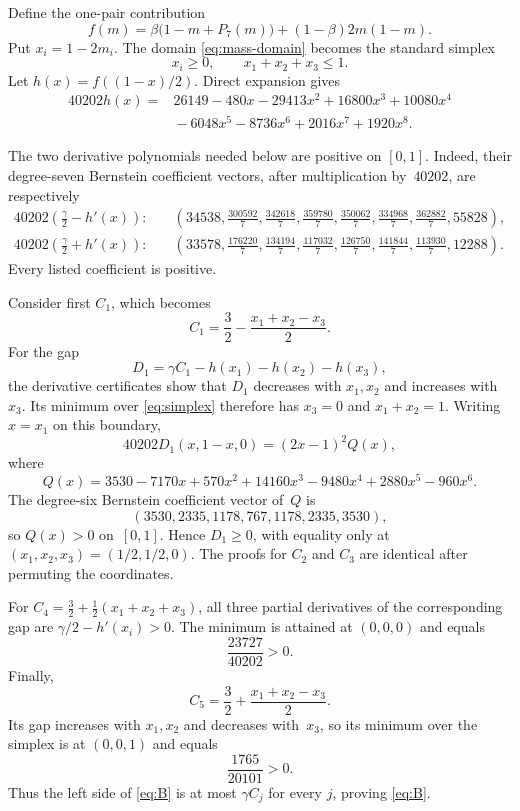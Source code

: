 \documentclass[11pt,letterpaper]{article}
\theoremstyle{definition}
\theoremstyle{remark}
\newcommand{\1}{\mathbf{1}}
\begin{document}
Define the one-pair contribution
\[
 f(m)=\beta\bigl(1-m+P_7(m)\bigr)
 +(1-\beta)2m(1-m).
\]
Put $x_i=1-2m_i$.  The domain \eqref{eq:mass-domain} becomes the standard simplex
\begin{equation}\label{eq:simplex}
 x_i\ge0,
 \qquad
 x_1+x_2+x_3\le1.
\end{equation}
Let $h(x)=f((1-x)/2)$.  Direct expansion gives
\begin{align}
 40202h(x)={}&26149-480x-29413x^2+16800x^3+10080x^4\nonumber\\
 &{}-6048x^5-8736x^6+2016x^7+1920x^8.
 \label{eq:hpoly}
\end{align}
\begin{samepage}
The two derivative polynomials needed below are positive on $[0,1]$.  Indeed, their degree-seven Bernstein coefficient vectors, after multiplication by~$40202$, are respectively
\begin{align*}
 40202\left(\frac\gamma2-h'(x)\right):\quad
 &\left(34538,\frac{300592}{7},\frac{342618}{7},
 \frac{359780}{7},\frac{350062}{7},\frac{334968}{7},
 \frac{362882}{7},55828\right),\\
 40202\left(\frac\gamma2+h'(x)\right):\quad
 &\left(33578,\frac{176220}{7},\frac{134194}{7},
 \frac{117032}{7},\frac{126750}{7},\frac{141844}{7},
 \frac{113930}{7},12288\right).
\end{align*}
Every listed coefficient is positive.
\end{samepage}

Consider first $C_1$, which becomes
\[
 C_1=\frac32-\frac{x_1+x_2-x_3}{2}.
\]
For the gap
\[
 D_1=\gamma C_1-h(x_1)-h(x_2)-h(x_3),
\]
the derivative certificates show that $D_1$ decreases with $x_1,x_2$ and increases with~$x_3$.  Its minimum over \cref{eq:simplex} therefore has $x_3=0$ and $x_1+x_2=1$.  Writing $x=x_1$ on this boundary,
\begin{equation}\label{eq:boundary-factor}
 40202D_1(x,1-x,0)=(2x-1)^2Q(x),
\end{equation}
where
\[
 Q(x)=3530-7170x+570x^2+14160x^3-9480x^4+2880x^5-960x^6.
\]
The degree-six Bernstein coefficient vector of~$Q$ is
\[
 (3530,2335,1178,767,1178,2335,3530),
\]
so $Q(x)>0$ on~$[0,1]$.  Hence $D_1\ge0$, with equality only at $(x_1,x_2,x_3)=(1/2,1/2,0)$.  The proofs for $C_2$ and $C_3$ are identical after permuting the coordinates.

For $C_4=\frac32+\frac12(x_1+x_2+x_3)$, all three partial derivatives of the corresponding gap are $\gamma/2-h'(x_i)>0$.  The minimum is attained at $(0,0,0)$ and equals
\[
 \frac{23727}{40202}>0.
\]
Finally,
\[
 C_5=\frac32+\frac{x_1+x_2-x_3}{2}.
\]
Its gap increases with $x_1,x_2$ and decreases with~$x_3$, so its minimum over the simplex is at $(0,0,1)$ and equals
\[
 \frac{1765}{20101}>0.
\]
Thus the left side of \cref{eq:B} is at most $\gamma C_j$ for every $j$, proving \cref{eq:B}.
\end{document}

